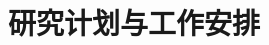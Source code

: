 \section{研究计划与工作安排}
\begin{frame}{\insertsection}{\insertsubsection}
\end{frame}
\begin{frame}{\insertsection}{\insertsubsection}
\end{frame}

